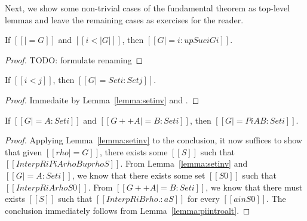 \documentclass[acmsmall]{acmart}
\begin{document}
Next, we show some non-trivial cases of the fundamental theorem as
top-level lemmas and leave the remaining cases as exercises for the reader.
\begin{lemma}[ST-Var]
  \label{lemma:stvar}
  If $[[|= G]]$ and $[[i < |G|]]$, then $[[G |= i : up Suc i G i]]$.
\end{lemma}
\begin{proof}
  TODO: formulate renaming
\end{proof}

\begin{lemma}[ST-Set]
  \label{lemma:stset}
  If $[[i < j]]$, then $[[G |= Set i : Set j]]$.
\end{lemma}
\begin{proof}
  Immedaite by Lemma~\ref{lemma:setinv} and .
\end{proof}

\begin{lemma}[ST-Pi]
  \label{lemma:stpi}
  If $[[G |= A : Set i]]$ and $[[G ++ A |= B : Set i]]$, then $[[G |= Pi
  A B : Set i]]$.
\end{lemma}
\begin{proof}
  Applying Lemma~\ref{lemma:setinv} to the
  conclusion, it now suffices to show that given $[[rho |= G]]$, there
  exists some $[[S]]$ such that $[[InterpR i Pi A{rho} B{up rho} S]]$.
  From Lemma~\ref{lemma:setinv} and $[[G |= A : Set i]]$, we know that
  there exists some set $[[S0]]$ such that $[[InterpR i A {rho} S0]]$.
From $[[G ++ A |= B : Set i]]$, we know that there must
exists $[[S]]$ such that $[[InterpR i B {rho .: a} S]]$ for every $[[a
in S0]]$. The conclusion immediately follows from Lemma~\ref{lemma:piintroalt}.
\end{proof}
\end{document}
